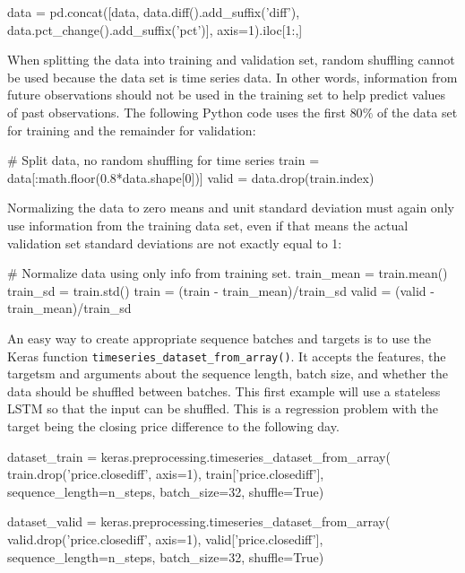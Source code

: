 \begin{samepage}
\begin{pythoncode}
data = pd.concat([data,
    data.diff().add_suffix('diff'),
    data.pct_change().add_suffix('pct')],
    axis=1).iloc[1:,]
\end{pythoncode}
\end{samepage}

When splitting the data into training and validation set, random shuffling cannot be used because the data set is time series data. In other words, information from future observations should not be used in the training set to help predict values of past observations. The following Python code uses the first $80\%$ of the data set for training and the remainder for validation:

\begin{samepage}
\begin{pythoncode}    
# Split data, no random shuffling for time series
train = data[:math.floor(0.8*data.shape[0])]
valid = data.drop(train.index)
\end{pythoncode}
\end{samepage}

Normalizing the data to zero means and unit standard deviation must again only use information from the training data set, even if that means the actual validation set standard deviations are not exactly equal to 1:

\begin{samepage}
\begin{pythoncode}
# Normalize data using only info from training set.
train_mean = train.mean()
train_sd = train.std()
train = (train - train_mean)/train_sd
valid = (valid - train_mean)/train_sd
\end{pythoncode}
\end{samepage}

An easy way to create appropriate sequence batches and targets is to use the Keras function \texttt{timeseries\_dataset\_from\_array()}. It accepts the features, the targetsm and arguments about the sequence length, batch size, and whether the data should be shuffled between batches. This first example will use a stateless LSTM so that the input can be shuffled. This is a regression problem with the target being the closing price difference to the following day.

\begin{samepage}
\begin{pythoncode}
dataset_train = keras.preprocessing.timeseries_dataset_from_array(
    train.drop('price.closediff', axis=1), train['price.closediff'],
    sequence_length=n_steps,
    batch_size=32,
    shuffle=True)

dataset_valid = keras.preprocessing.timeseries_dataset_from_array(
    valid.drop('price.closediff', axis=1), valid['price.closediff'],
    sequence_length=n_steps,
    batch_size=32,
    shuffle=True)
\end{pythoncode}
\end{samepage}

